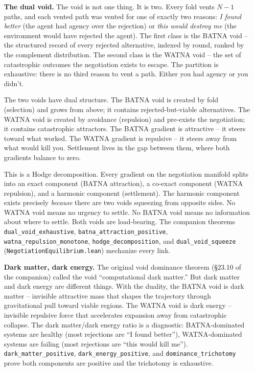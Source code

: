 \documentclass[
  11pt,
]{article}
\begin{document}
\textbf{The dual void.} The void is not one thing. It is two. Every fold
vents \(N - 1\) paths, and each vented path was vented for one of
exactly two reasons: \emph{I found better} (the agent had agency over
the rejection) or \emph{this would destroy me} (the environment would
have rejected the agent). The first class is the BATNA void -- the
structured record of every rejected alternative, indexed by round,
ranked by the complement distribution. The second class is the WATNA
void -- the set of catastrophic outcomes the negotiation exists to
escape. The partition is exhaustive: there is no third reason to vent a
path. Either you had agency or you didn't.

The two voids have dual structure. The BATNA void is created by fold
(selection) and grows from above; it contains rejected-but-viable
alternatives. The WATNA void is created by avoidance (repulsion) and
pre-exists the negotiation; it contains catastrophic attractors. The
BATNA gradient is attractive -- it steers toward what worked. The WATNA
gradient is repulsive -- it steers away from what would kill you.
Settlement lives in the gap between them, where both gradients balance
to zero.

This is a Hodge decomposition. Every gradient on the negotiation
manifold splits into an exact component (BATNA attraction), a co-exact
component (WATNA repulsion), and a harmonic component (settlement). The
harmonic component exists precisely \emph{because} there are two voids
squeezing from opposite sides. No WATNA void means no urgency to settle.
No BATNA void means no information about where to settle. Both voids are
load-bearing. The companion theorems \texttt{dual\_void\_exhaustive},
\texttt{batna\_attraction\_positive},
\texttt{watna\_repulsion\_monotone}, \texttt{hodge\_decomposition}, and
\texttt{dual\_void\_squeeze} (\texttt{NegotiationEquilibrium.lean})
mechanize every link.

\textbf{Dark matter, dark energy.} The original void dominance theorem
(§23.10 of the companion) called the void ``computational dark matter.''
But dark matter and dark energy are different things. With the duality,
the BATNA void is dark matter -- invisible attractive mass that shapes
the trajectory through gravitational pull toward viable regions. The
WATNA void is dark energy -- invisible repulsive force that accelerates
expansion away from catastrophic collapse. The dark matter/dark energy
ratio is a diagnostic: BATNA-dominated systems are healthy (most
rejections are ``I found better''), WATNA-dominated systems are failing
(most rejections are ``this would kill me'').
\texttt{dark\_matter\_positive}, \texttt{dark\_energy\_positive}, and
\texttt{dominance\_trichotomy} prove both components are positive and
the trichotomy is exhaustive.
\end{document}
